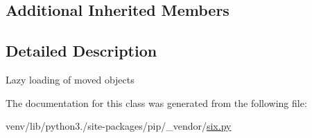 \subsection*{Additional Inherited Members}


\subsection{Detailed Description}
\begin{DoxyVerb}Lazy loading of moved objects\end{DoxyVerb}
 

The documentation for this class was generated from the following file\+:\begin{DoxyCompactItemize}
\item 
venv/lib/python3./site-\/packages/pip/\+\_\+vendor/\hyperlink{pip_2__vendor_2six_8py}{six.\+py}\end{DoxyCompactItemize}
